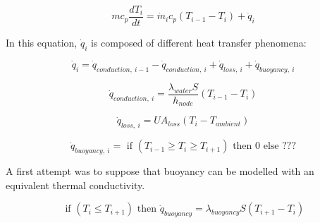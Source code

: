 \begin{equation}
mc_p \frac{dT_i}{dt}=\dot{m}_ic_p(T_{i-1} - T_i) + \dot{q}_i
\label{eq:}
\end{equation}

In this equation, $\dot{q}_i$ is composed of different heat transfer phenomena:

\begin{equation}
\dot{q}_i = \dot{q}_{conduction,~i-1} - \dot{q}_{conduction,~i} + \dot{q}_{loss,~i} +  \dot{q}_{buoyancy,~i}
\label{eq:}
\end{equation}

\begin{equation}
\dot{q}_{conduction,~i} = \frac{\lambda_{water} S}{h_{node}} (T_{i-1} - T_i) 
\label{eq:}
\end{equation}

\begin{equation}
\dot{q}_{loss,~i} = UA_{loss}(T_{i} - T_{ambient}) 
\label{eq:}
\end{equation}

\begin{equation}
\dot{q}_{buoyancy,~i} = \text{ if } (T_{i-1} \geq T_i \geq T_{i+1}) \text{ then } 0 \text{ else } ???
\label{eq:}
\end{equation}

A first attempt was to suppose that buoyancy can be modelled with an equivalent thermal conductivity. 

\begin{equation}
\text{ if } (T_{i} \leq T_{i+1}) \text{ then } \dot{q}_{buoyancy} = \lambda_{buoyancy} S (T_{i+1}-T_i)
\label{eq:}
\end{equation}


